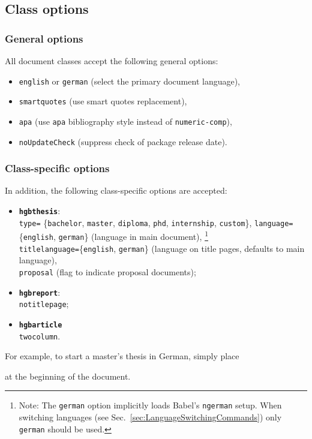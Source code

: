 \documentclass[english]{hgbarticle}
\begin{document}
\subsection{Class options}

\subsubsection{General options}

All document classes accept the following general options:
%
\begin{itemize}
    \item \texttt{english} or \texttt{german} 
        (select the primary document language),
    \item \texttt{smartquotes} (use smart quotes replacement),
    \item \texttt{apa} (use \texttt{apa} bibliography style instead of
    \texttt{numeric-comp}),
    \item \texttt{noUpdateCheck} (suppress check of package release date).
\end{itemize}


\subsubsection{Class-specific options}

In addition, the following class-specific options are accepted:
%
\begin{itemize}
    \item \textbf{\texttt{hgbthesis}}:\\
      \texttt{type=}%
      \{\texttt{bachelor}, \texttt{master}, \texttt{diploma}, \texttt{phd}, \texttt{internship}, \texttt{custom}\},\newline
      \texttt{language=}\{\texttt{english}, \texttt{german}\} (language in main document),%
				\footnote{Note: The \texttt{german} option implicitly loads Babel's \texttt{ngerman} setup. 
				When switching languages (see Sec.~\ref{sec:LanguageSwitchingCommands}) only \texttt{german} should be used.}
			\\
      \texttt{titlelanguage=}\{\texttt{english}, \texttt{german}\} (language on title pages, defaults to main language),\\
      \texttt{proposal} (flag to indicate proposal documents);
    \item \textbf{\texttt{hgbreport}}:\\
      \texttt{notitlepage};
    \item \textbf{\texttt{hgbarticle}}\\
      \texttt{twocolumn}.
\end{itemize}
%
For example, to start a master's thesis in German, simply place
%
%
at the beginning of the document.
\end{document}
